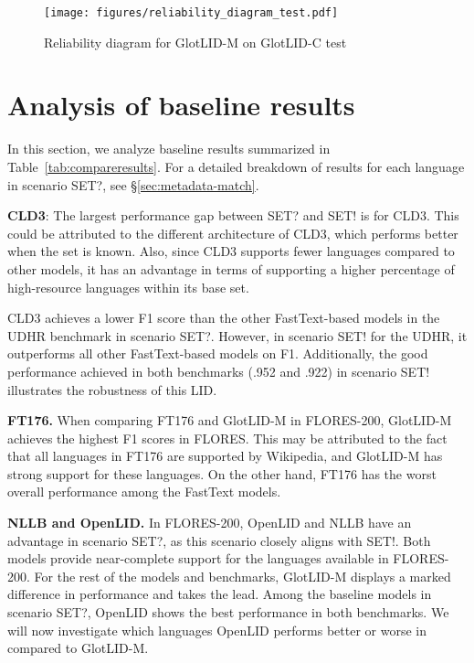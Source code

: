 \documentclass[11pt]{article}
\newcommand{\basequ}{SET?\xspace}
\newcommand{\baseex}{SET!\xspace}
\def\modelname{\mbox{GlotLID-M}\xspace}
\def\corpusname{\mbox{GlotLID-C}\xspace}
\def\flores{FLORES\xspace}
\def\udhr{UDHR\xspace}
\def\ft176{FT176\xspace}
\def\edin{OpenLID\xspace}
\def\nllb{NLLB\xspace}
\def\tabref#1{Table~\ref{tab:#1}}
\def\secref#1{\S\ref{sec:#1}}
\begin{document}
\begin{figure}[ht]
    \centering
    \texttt{[image: figures/reliability\_diagram\_test.pdf]}
    \caption{Reliability diagram for \modelname on \corpusname test}
    \label{fig:reliability-test}
\end{figure}

\section{Analysis of baseline results}

In this section, we analyze baseline results summarized in \tabref{compareresults}. For a detailed breakdown of results for each language in scenario \basequ, see \secref{metadata-match}.


\textbf{CLD3}: The largest performance gap between \basequ and \baseex{} is for CLD3. This could be attributed to the different architecture of CLD3, which performs better when the set is known. Also, since CLD3 supports fewer languages compared to other models, it has an advantage in terms of supporting a higher percentage of high-resource languages within its base set.

CLD3 achieves a lower F1 score than the other FastText-based models in the \udhr benchmark in scenario \basequ. However, in scenario \baseex for the \udhr, it outperforms all other FastText-based models on F1. Additionally, the good performance achieved in both benchmarks (.952 and .922) in scenario \baseex illustrates the robustness of this LID.

\textbf{\ft176.} When comparing \ft176 and \modelname in \flores-200, \modelname achieves the highest F1 scores in \flores. This may be attributed to the fact that all languages in \ft176 are supported by Wikipedia, and \modelname has strong support for these languages. On the other hand, \ft176 has the worst overall performance among the FastText models.


\textbf{\nllb and \edin.} In \flores-200, \edin and \nllb have an advantage in scenario \basequ, as this scenario closely aligns with \baseex. Both models provide near-complete support for the languages available in \flores-200. For the rest of the models and benchmarks, \modelname displays a marked difference in performance and takes the lead. Among the baseline models in scenario \basequ, \edin shows the best performance in both benchmarks. We will now investigate which languages \edin performs better or worse in compared to \modelname.
\end{document}
